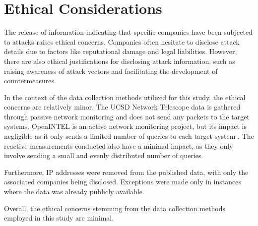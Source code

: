 \section{Ethical Considerations} \label{sec:ethicalconsiderations}
The release of information indicating that specific companies have been subjected to attacks raises ethical concerns.
Companies often hesitate to disclose attack details due to factors like reputational damage and legal liabilities.
However, there are also ethical justifications for disclosing attack information, such as raising awareness of attack vectors and facilitating the development of countermeasures.

In the context of the data collection methods utilized for this study, the ethical concerns are relatively minor.
The UCSD Network Telescope data is gathered through passive network monitoring and does not send any packets to the target systems.
OpenINTEL is an active network monitoring project, but its impact is negligible as it only sends a limited number of queries to each target system \cite{openintel}.
The reactive measurements conducted also have a minimal impact, as they only involve sending a small and evenly distributed number of queries.

Furthermore, IP addresses were removed from the published data, with only the associated companies being disclosed.
Exceptions were made only in instances where the data was already publicly available.

Overall, the ethical concerns stemming from the data collection methods employed in this study are minimal.